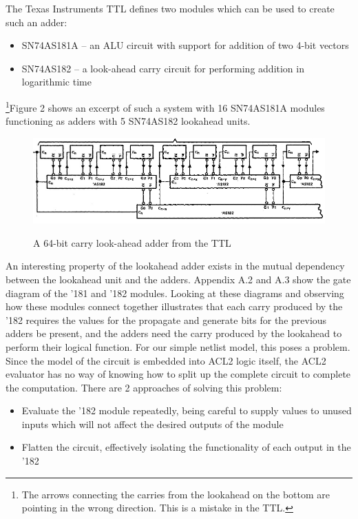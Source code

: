 \documentclass[fleqn,10pt]{SelfArx} %
\begin{document}
The Texas Instruments TTL\cite{TTL} defines two modules which can be used to create such an adder:
\begin{itemize}
\item SN74AS181A -- an ALU circuit with support for addition of two 4-bit vectors
\item SN74AS182 -- a look-ahead carry circuit for performing addition in logarithmic time
\end{itemize}

\footnote{The arrows connecting the carries from the lookahead on the bottom are pointing in the wrong direction. This is a mistake in the TTL.}Figure 2 shows an excerpt of such a system with 16 SN74AS181A modules functioning as adders with 5 SN74AS182 lookahead units.

\begin{figure}[ht!]
  \caption{A 64-bit carry look-ahead adder from the TTL \cite{TTL}}
  {%
\setlength{\fboxsep}{0pt}%
\setlength{\fboxrule}{1pt}%
\includegraphics[width=\columnwidth]{lookahead.png}%
}%
\end{figure}

An interesting property of the lookahead adder exists in the mutual dependency between the lookahead unit and the adders. Appendix A.2 and A.3 show the gate diagram of the '181 and '182 modules. Looking at these diagrams and observing how these modules connect together illustrates that each carry produced by the '182 requires the values for the propagate and generate bits for the previous adders be present, and the adders need the carry produced by the lookahead to perform their logical function. For our simple netlist model, this poses a problem. Since the model of the circuit is embedded into ACL2 logic itself, the ACL2 evaluator has no way of knowing how to split up the complete circuit to complete the computation. There are 2 approaches of solving this problem:
\begin{itemize}
\item Evaluate the '182 module repeatedly, being careful to supply values to unused inputs which will not affect the desired outputs of the module
\item Flatten the circuit, effectively isolating the functionality of each output in the '182
\end{itemize}
\end{document}
